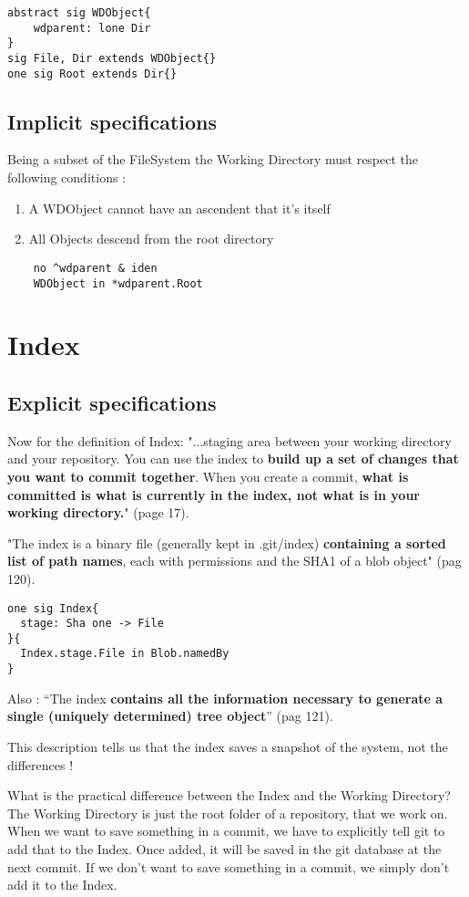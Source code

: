 \begin{lstlisting}
abstract sig WDObject{
	wdparent: lone Dir
}
sig File, Dir extends WDObject{}
one sig Root extends Dir{}
\end{lstlisting}

\subsection{Implicit specifications}

Being a subset of the FileSystem the Working Directory must respect
the following conditions :
	\begin{enumerate}
		\item A WDObject cannot have an ascendent that it's itself
		\item All Objects descend from the root directory
	\end{enumerate}

\begin{lstlisting}
	no ^wdparent & iden
	WDObject in *wdparent.Root
\end{lstlisting}


\section{Index}

\subsection{Explicit specifications}

Now for the definition of Index:
"...staging area between your working directory and your
repository. You can use the index to {\bf build up a set of 
changes that you want to commit together}. When you create
a commit, {\bf what is committed is what is currently in the
index, not what is in your working directory.}"
\cite{gitComm} (page 17). \par

"The index is a binary file (generally kept in .git/index) 
{\bf containing a sorted list of path names}, each with permissions and the
SHA1 of a blob object" \cite{gitComm} (pag 120). \par 

\begin{lstlisting}
one sig Index{	
  stage: Sha one -> File
}{
  Index.stage.File in Blob.namedBy
}
\end{lstlisting}

Also : ``The index {\bf contains all the information necessary to generate a single
(uniquely determined) tree object}'' \cite{gitComm} (pag 121). \par
This description tells us that the index saves a snapshot of the system,
not the differences !

What is the practical difference between the Index and the Working
Directory? The Working Directory is just the root folder of a repository,
that we work on. When we want to save something in a commit, we have to explicitly 
tell git to add that to the Index. Once added, it
will be saved in the git database at the next commit. If we don't want to save
something in a commit, we simply don't add it to the Index.

